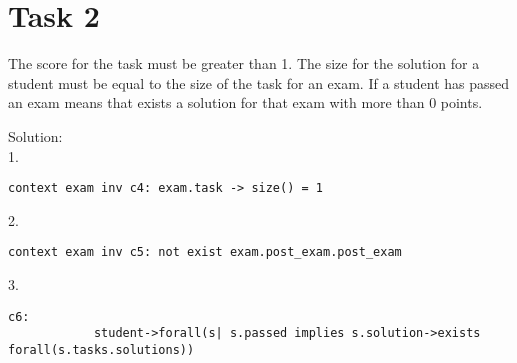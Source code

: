 \chapter{Task 2}
\begin{parlist}
	\item The score for the task must be greater than 1. The size for the solution for a student must be equal to the size of the task for an exam. If a student has passed an exam means that exists a solution for that exam with more than 0 points.
	\item Solution:\\ 1. %
	\begin{lstlisting}[language=OCL, frame=trBL]
		context exam inv c4: exam.task -> size() = 1
	\end{lstlisting}
	2.
	\begin{lstlisting}[language=OCL, frame=trBL]
		context exam inv c5: not exist exam.post_exam.post_exam 
	\end{lstlisting}
	3.
	\begin{lstlisting}[language=OCL, frame=trBL]
		c6:
			student->forall(s| s.passed implies s.solution->exists forall(s.tasks.solutions))
	\end{lstlisting}
\end{parlist}